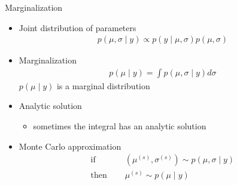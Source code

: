 \documentclass[finnish,english,t]{beamer}
\begin{document}
\begin{frame}{Marginalization}

  \begin{itemize}
  \item<+-> Joint distribution of parameters
    \begin{align*}
      p(\mu, \sigma \mid y) \propto p(y \mid \mu,\sigma)p(\mu, \sigma)
    \end{align*}
  \item<+-> Marginalization
      \begin{align*}
        p(\mu \mid y) = \int p(\mu, \sigma \mid y) d\sigma
      \end{align*}
      $p(\mu \mid y)$ is a marginal distribution
       \vspace{0.5\baselineskip}
     \item<+-> Analytic solution
       \begin{itemize}
       \item sometimes the integral has an analytic solution
       \end{itemize}
    \item<+-> Monte Carlo approximation
      \begin{align*}
        \text{if }\quad & (\mu^{(s)},\sigma^{(s)}) \sim p(\mu,\sigma \mid y) \\
        \text{then }\quad & \mu^{(s)} \sim p(\mu \mid y)
    \end{align*}
  \end{itemize}

\end{frame}
\end{document}
